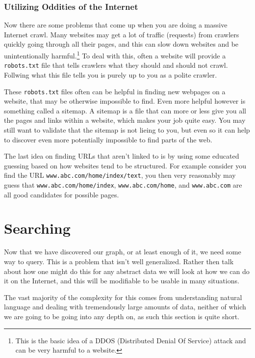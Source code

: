 \documentclass{article}
\begin{document}
	\subsubsection{Utilizing Oddities of the Internet}
	Now there are some problems that come up when you are doing a massive Internet crawl. Many websites may get a lot of traffic (requests) from crawlers quickly going through all their pages, and this can slow down websites and be unintentionally harmful.\footnote{This is the basic idea of a DDOS (Distributed Denial Of Service) attack and can be very harmful to a website.} To deal with this, often a website will provide a \verb|robots.txt| file that tells crawlers what they should and should not crawl. Follwing what this file tells you is purely up to you as a polite crawler. 
	
	These \verb|robots.txt| files often can be helpful in finding new webpages on a website, that may be otherwise impossible to find. Even more helpful however is something called a sitemap. A sitemap is a file that can more or less give you all the pages and links within a website, which makes your job quite easy. You may still want to validate that the sitemap is not lieing to you, but even so it can help to discover even more potentially impossible to find parts of the web.
	
	The last idea on finding URLs that aren't linked to is by using some educated guessing based on how websites tend to be structured. For example consider you find the URL \verb|www.abc.com/home/index/text|, you then very reasonably may guess that \verb|www.abc.com/home/index|, \verb|www.abc.com/home|, and \verb|www.abc.com| are all good candidates for possible pages.
	
	\section{Searching}
	
	Now that we have discovered our graph, or at least enough of it, we need some way to query. This is a problem that isn't well generalized. Rather then talk about how one might do this for any abstract data we will look at how we can do it on the Internet, and this will be modifiable to be usable in many situations.
	
	The vast majority of the complexity for this comes from understanding natural language and dealing with tremendously large amounts of data, neither of which we are going to be going into any depth on, as such this section is quite short.
	
\end{document}
